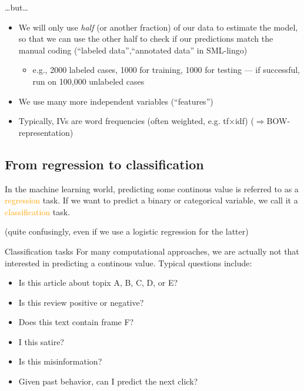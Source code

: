 \documentclass[compress]{beamer}
\begin{document}
\begin{frame}{\ldots but\ldots}
	\begin{itemize}
		\item<1-> We will only use \emph{half} {\tiny{(or another fraction)}} of our data to estimate the model, so that we can use the other half to check if our predictions match the manual coding (``labeled data'',``annotated data'' in SML-lingo)
		\begin{itemize}
			\item<2->e.g., 2000 labeled cases, 1000 for training, 1000 for testing --- if successful, run on 100,000 unlabeled cases
		\end{itemize}
		\item<3-> We use many more independent variables (``features'')
		\item<4-> Typically, IVs are word frequencies (often weighted, e.g. tf$\times$idf) ($\Rightarrow$BOW-representation)
	\end{itemize}
\end{frame}


\subsection{From regression to classification}
	
\begin{frame}[standout]
In the machine learning world, predicting some continous value is referred to as a \textcolor{orange}{regression} task. If we want to predict a binary or categorical variable, we call it a \textcolor{orange}{classification} task.

(quite confusingly, even if we use a logistic regression for the latter)
\end{frame}


\begin{frame}{Classification tasks}
For many computational approaches, we are actually not that interested in predicting a continous value. Typical questions include:
\begin{itemize}
	\item Is this article about topix A, B, C, D, or E?
	\item Is this review positive or negative?
	\item Does this text contain frame F?
	\item I this satire? 
	\item Is this misinformation?
	\item Given past behavior, can I predict the next click?
\end{itemize}
\end{frame}
\end{document}
